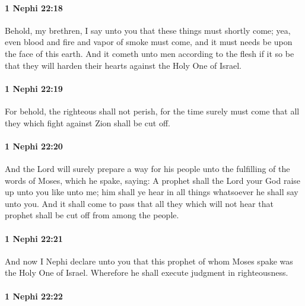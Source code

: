 		\paragraph{1 Nephi 22:18} %
			\label{1 Nephi-22-18}

			Behold, my brethren, I say unto you
			that these things must shortly come;
			yea, even blood and fire and vapor of smoke must come,
			and it must needs be upon the face of this earth.
			And it cometh unto men according to the flesh
			if it so be that they will harden their hearts against the Holy One of Israel.

		\paragraph{1 Nephi 22:19} %
			\label{1 Nephi-22-19}

			For behold, the righteous shall not perish,
			for the time surely must come
			that all they which fight against Zion shall be cut off.

		\paragraph{1 Nephi 22:20} %
			\label{1 Nephi-22-20}

			And the Lord will surely prepare a way for his people
			unto the fulfilling of the words of Moses,
			which he spake, saying:
			A prophet shall the Lord your God raise up unto you like unto me;
			him shall ye hear in all things whatsoever he shall say unto you.
			And it shall come to pass that all they which will not hear that prophet
			shall be cut off from among the people.

		\paragraph{1 Nephi 22:21} %
			\label{1 Nephi-22-21}

			And now I Nephi declare unto you that
			this prophet of whom Moses spake was the Holy One of Israel.
			Wherefore he shall execute judgment in righteousness.

		\paragraph{1 Nephi 22:22} %
			\label{1 Nephi-22-22}

